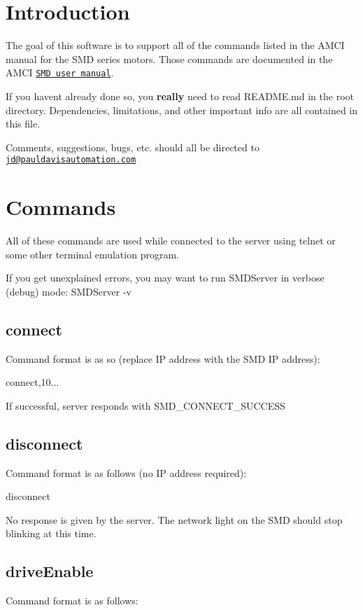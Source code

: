 \hypertarget{index_Introduction}{}\section{Introduction}\label{index_Introduction}
The goal of this software is to support all of the commands listed in the A\+M\+C\+I manual for the S\+M\+D series motors. Those commands are documented in the A\+M\+C\+I \href{http://www.amci.com/stepper-motor-control/integrated-stepper-motor-control-smd23e.asp}{\tt S\+M\+D user manual}.

If you haven\textquotesingle{}t already done so, you {\bfseries really} need to read R\+E\+A\+D\+M\+E.\+md in the root directory. Dependencies, limitations, and other important info are all contained in this file.

Comments, suggestions, bugs, etc. should all be directed to \href{jd@pauldavisautomation.com}{\tt jd@pauldavisautomation.\+com}\hypertarget{index_Commands}{}\section{Commands}\label{index_Commands}
All of these commands are used while connected to the server using {\ttfamily telnet} or some other terminal emulation program.

If you get unexplained errors, you may want to run S\+M\+D\+Server in verbose (debug) mode\+: {\ttfamily S\+M\+D\+Server -\/v}\hypertarget{index_connect}{}\subsection{connect}\label{index_connect}
Command format is as so (replace I\+P address with the S\+M\+D I\+P address)\+:

{\ttfamily connect,10...}

If successful, server responds with {\ttfamily S\+M\+D\+\_\+\+C\+O\+N\+N\+E\+C\+T\+\_\+\+S\+U\+C\+C\+E\+S\+S}\hypertarget{index_disconnect}{}\subsection{disconnect}\label{index_disconnect}
Command format is as follows (no I\+P address required)\+:

{\ttfamily disconnect}

No response is given by the server. The network light on the S\+M\+D should stop blinking at this time.\hypertarget{index_driveEnable}{}\subsection{drive\+Enable}\label{index_driveEnable}
Command format is as follows\+:

